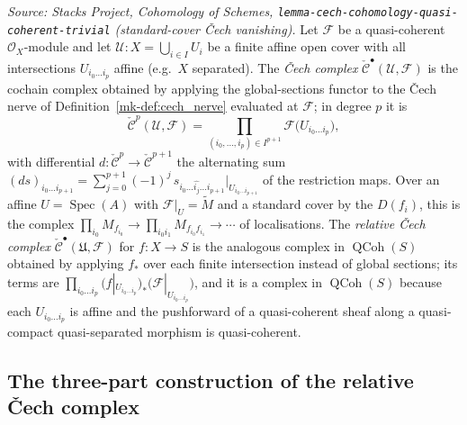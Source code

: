 \begin{definition}\label{mk-def:cech_complex}
  \leanok

  \textit{Source: Stacks Project, Cohomology of Schemes,
  \texttt{lemma-cech-cohomology-quasi-coherent-trivial} (standard-cover {\v C}ech
  vanishing).}
  Let \(\mathcal{F}\) be a quasi-coherent \(\mathcal{O}_X\)-module and let
  \(\mathcal{U} : X = \bigcup_{i \in I} U_i\) be a finite affine open cover with
  all intersections \(U_{i_0 \ldots i_p}\) affine (e.g.\ \(X\) separated). The
  \emph{{\v C}ech complex} \(\check{\mathcal{C}}^\bullet(\mathcal{U}, \mathcal{F})\)
  is the cochain complex obtained by applying the global-sections functor to the
  {\v C}ech nerve of Definition~\ref{mk-def:cech_nerve} evaluated at \(\mathcal{F}\);
  in degree \(p\) it is
  \[
    \check{\mathcal{C}}^p(\mathcal{U}, \mathcal{F})
      = \prod_{(i_0, \ldots, i_p) \in I^{p+1}}
        \mathcal{F}\bigl(U_{i_0 \ldots i_p}\bigr),
  \]
  with differential \(d : \check{\mathcal{C}}^p \to \check{\mathcal{C}}^{p+1}\) the
  alternating sum \((d s)_{i_0 \ldots i_{p+1}} = \sum_{j=0}^{p+1} (-1)^j\,
  s_{i_0 \ldots \widehat{i_j} \ldots i_{p+1}}|_{U_{i_0 \ldots i_{p+1}}}\) of the
  restriction maps. Over an affine \(U = \operatorname{Spec}(A)\) with
  \(\mathcal{F}|_U = \widetilde{M}\) and a standard cover by the
  \(D(f_i)\), this is the complex
  \(\prod_{i_0} M_{f_{i_0}} \to \prod_{i_0 i_1} M_{f_{i_0} f_{i_1}} \to \cdots\) of
  localisations. The \emph{relative {\v C}ech complex} \(\check{\mathcal{C}}^\bullet
  (\mathfrak{U}, \mathcal{F})\) for \(f : X \to S\) is the analogous complex in
  \(\operatorname{QCoh}(S)\) obtained by applying \(f_*\) over each finite
  intersection instead of global sections; its terms are
  \(\prod_{i_0 \ldots i_p} (f|_{U_{i_0 \ldots i_p}})_*
  \bigl(\mathcal{F}|_{U_{i_0 \ldots i_p}}\bigr)\), and it is a complex in
  \(\operatorname{QCoh}(S)\) because each \(U_{i_0 \ldots i_p}\) is affine and the
  pushforward of a quasi-coherent sheaf along a quasi-compact quasi-separated
  morphism is quasi-coherent.
\end{definition}

\subsection{The three-part construction of the relative {\v C}ech complex}
\label{mk-sec:cech_three_part}

